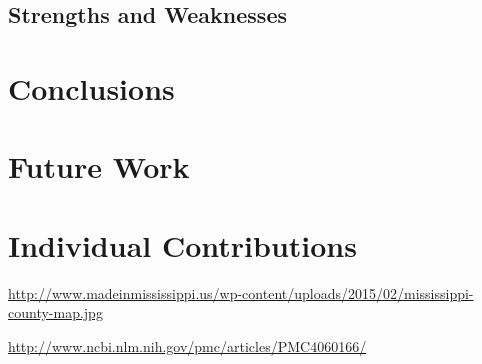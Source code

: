 \documentclass[titlepage]{article}
\begin{document}
  \subsection{Strengths and Weaknesses}

\section{Conclusions}
\label{sec:conclusions}

\section{Future Work}
\label{sec:future}

\section{Individual Contributions}
\label{sec:contributions}
  \begin{thebibliography}{9}
      \url{http://www.madeinmississippi.us/wp-content/uploads/2015/02/mississippi-county-map.jpg}

      \url{http://www.ncbi.nlm.nih.gov/pmc/articles/PMC4060166/}
    
  \end{thebibliography}
\end{document}
